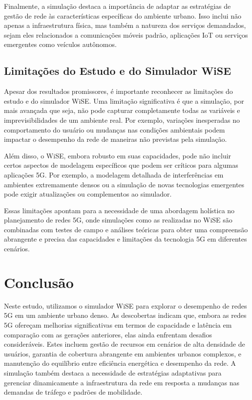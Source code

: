 \documentclass[journal]{IEEEtran}
\begin{document}
Finalmente, a simulação destaca a importância de adaptar as estratégias de gestão de rede às características específicas do ambiente urbano. Isso inclui não apenas a infraestrutura física, mas também a natureza dos serviços demandados, sejam eles relacionados a comunicações móveis padrão, aplicações IoT ou serviços emergentes como veículos autônomos.

\subsection{Limitações do Estudo e do Simulador WiSE}

Apesar dos resultados promissores, é importante reconhecer as limitações do estudo e do simulador WiSE. Uma limitação significativa é que a simulação, por mais avançada que seja, não pode capturar completamente todas as variáveis e imprevisibilidades de um ambiente real. Por exemplo, variações inesperadas no comportamento do usuário ou mudanças nas condições ambientais podem impactar o desempenho da rede de maneiras não previstas pela simulação.

Além disso, o WiSE, embora robusto em suas capacidades, pode não incluir certos aspectos de modelagem específicos que podem ser críticos para algumas aplicações 5G. Por exemplo, a modelagem detalhada de interferências em ambientes extremamente densos ou a simulação de novas tecnologias emergentes pode exigir atualizações ou complementos ao simulador.

Essas limitações apontam para a necessidade de uma abordagem holística no planejamento de redes 5G, onde simulações como as realizadas no WiSE são combinadas com testes de campo e análises teóricas para obter uma compreensão abrangente e precisa das capacidades e limitações da tecnologia 5G em diferentes cenários.

\section{Conclusão}

Neste estudo, utilizamos o simulador WiSE para explorar o desempenho de redes 5G em um ambiente urbano denso. As descobertas indicam que, embora as redes 5G ofereçam melhorias significativas em termos de capacidade e latência em comparação com as gerações anteriores, elas ainda enfrentam desafios consideráveis. Estes incluem gestão de recursos em cenários de alta densidade de usuários, garantia de cobertura abrangente em ambientes urbanos complexos, e manutenção do equilíbrio entre eficiência energética e desempenho da rede. A simulação também destaca a necessidade de estratégias adaptativas para gerenciar dinamicamente a infraestrutura da rede em resposta a mudanças nas demandas de tráfego e padrões de mobilidade.
\end{document}
